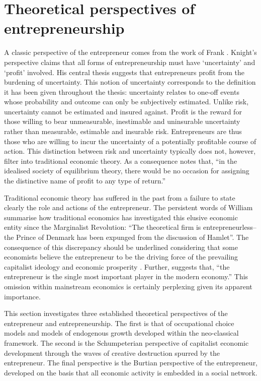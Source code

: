 \section{Theoretical perspectives of entrepreneurship}
\label{sec:PerspectivesEntrepreneurship}

A classic perspective of the entrepreneur comes from the work of Frank \citet{Knight1921}. Knight's perspective claims that all forms of entrepreneurship must have `uncertainty' and `profit' involved. His central thesis suggests that entrepreneurs profit from the burdening of uncertainty. This notion of uncertainty corresponds to the definition it has been given throughout the thesis: uncertainty relates to one-off events whose probability and outcome can only be subjectively estimated. Unlike risk, uncertainty cannot be estimated and insured against. Profit is the reward for those willing to bear unmeasurable, inestimable and uninsurable uncertainty rather than measurable, estimable and insurable risk. Entrepreneurs are thus those who are willing to incur the uncertainty of a potentially profitable course of action. This distinction between risk and uncertainty typically does not, however, filter into traditional economic theory. As a consequence \citet[p.~282]{Knight1935} notes that, ``in the idealised society of equilibrium theory, there would be no occasion for assigning the distinctive name of profit to any type of return.''

Traditional economic theory has suffered in the past from a failure to state clearly the role and actions of the entrepreneur. The persistent words of William \citet[p.~66]{Baumol1968} summarise how traditional economics has investigated this elusive economic entity since the Marginalist Revolution: ``The theoretical firm is entrepreneurless--the Prince of Denmark has been expunged from the discussion of Hamlet''. The consequence of this discrepancy should be underlined considering that some economists believe the entrepreneur to be the driving force of the prevailing capitalist ideology and economic prosperity \citep{Schmitz1989, WennekersThurik1999, Baumol2007}. Further, \citet[p.~1]{Lazear2002} suggests that, ``the entrepreneur is the single most important player in the modern economy.'' This omission within mainstream economics is certainly perplexing given its apparent importance. 

This section investigates three established theoretical perspectives of the entrepreneur and entrepreneurship. The first is that of occupational choice models and models of endogenous growth developed within the neo-classical framework. The second is the Schumpeterian perspective of capitalist economic development through the waves of creative destruction spurred by the entrepreneur. The final perspective is the Burtian perspective of the entrepreneur, developed on the basis that all economic activity is embedded in a social network.

